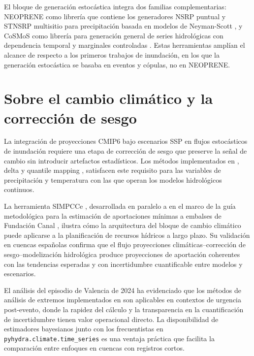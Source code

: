 El bloque de generación estocástica integra dos familias complementarias: NEOPRENE como librería que contiene los generadores NSRP puntual y STNSRP multisitio para precipitación basada en modelos de Neyman-Scott \parencite{rodriguezituribe1987,rodriguezituribe1988,diezsierra2023neoprene}, y CoSMoS como librería para generación general de series hidrológicas con dependencia temporal y marginales controladas \parencite{papalexiou2018storm}. Estas herramientas amplían el alcance de \pyhydra respecto a los primeros trabajos de inundación, en los que la generación estocástica se basaba en eventos y cópulas, no en NEOPRENE.

\section{Sobre el cambio climático y la corrección de sesgo}

La integración de proyecciones CMIP6 \parencite{eyring2016cmip6} bajo escenarios SSP \parencite{oneill2016ssp} en flujos estocásticos de inundación requiere una etapa de corrección de sesgo que preserve la señal de cambio sin introducir artefactos estadísticos. Los métodos implementados en \hydra, delta y quantile mapping \parencite{teutschbein2012biascorrection}, satisfacen este requisito para las variables de precipitación y temperatura con las que operan los modelos hidrológicos continuos.

La herramienta SIMPCCe \parencite{navas2025simpce}, desarrollada en paralelo a \hydra en el marco de la guía metodológica para la estimación de aportaciones mínimas a embalses de Fundación Canal \parencite{fundacioncanal2022guiaembalses}, ilustra cómo la arquitectura del bloque de cambio climático puede aplicarse a la planificación de recursos hídricos a largo plazo. Su validación en cuencas españolas confirma que el flujo proyecciones climáticas--corrección de sesgo--modelización hidrológica produce proyecciones de aportación coherentes con las tendencias esperadas y con incertidumbre cuantificable entre modelos y escenarios.

El análisis del episodio de Valencia de 2024 \parencite{navas2025valenciaIA} ha evidenciado que los métodos de análisis de extremos implementados en \hydra son aplicables en contextos de urgencia post-evento, donde la rapidez del cálculo y la transparencia en la cuantificación de incertidumbre tienen valor operacional directo. La disponibilidad de estimadores bayesianos junto con los frecuentistas en \texttt{pyhydra.climate.time\_series} es una ventaja práctica que facilita la comparación entre enfoques en cuencas con registros cortos.

